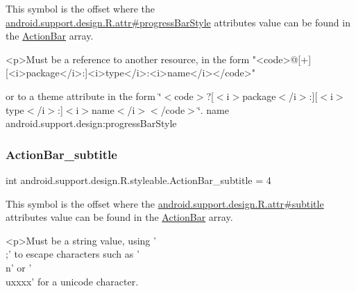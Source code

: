 This symbol is the offset where the \hyperlink{classandroid_1_1support_1_1design_1_1R_1_1attr_a6cda284efed118d0df86a70fe310133d}{android.\+support.\+design.\+R.\+attr\#progress\+Bar\+Style} attribute\textquotesingle{}s value can be found in the \hyperlink{classandroid_1_1support_1_1design_1_1R_1_1styleable_ab795220a96557d11f8c21359b95bed82}{Action\+Bar} array.

\begin{DoxyVerb}      <p>Must be a reference to another resource, in the form "<code>@[+][<i>package</i>:]<i>type</i>:<i>name</i></code>"
\end{DoxyVerb}
 or to a theme attribute in the form \char`\"{}$<$code$>$?\mbox{[}$<$i$>$package$<$/i$>$\+:\mbox{]}\mbox{[}$<$i$>$type$<$/i$>$\+:\mbox{]}$<$i$>$name$<$/i$>$$<$/code$>$\char`\"{}.  name android.\+support.\+design\+:progress\+Bar\+Style \mbox{\label{classandroid_1_1support_1_1design_1_1R_1_1styleable_a26cd68edf0c066a7b5fb1dbe28a37b3c}} 
\subsubsection{\texorpdfstring{Action\+Bar\+\_\+subtitle}{ActionBar\_subtitle}}
{\footnotesize\ttfamily int android.\+support.\+design.\+R.\+styleable.\+Action\+Bar\+\_\+subtitle = 4\hspace{0.3cm}{\ttfamily [static]}}

This symbol is the offset where the \hyperlink{classandroid_1_1support_1_1design_1_1R_1_1attr_a977d337b4627b48ff54cc6b947c7e7ca}{android.\+support.\+design.\+R.\+attr\#subtitle} attribute\textquotesingle{}s value can be found in the \hyperlink{classandroid_1_1support_1_1design_1_1R_1_1styleable_ab795220a96557d11f8c21359b95bed82}{Action\+Bar} array.

\begin{DoxyVerb}      <p>Must be a string value, using '\\;' to escape characters such as '\\n' or '\\uxxxx' for a unicode character.
\end{DoxyVerb}
 

